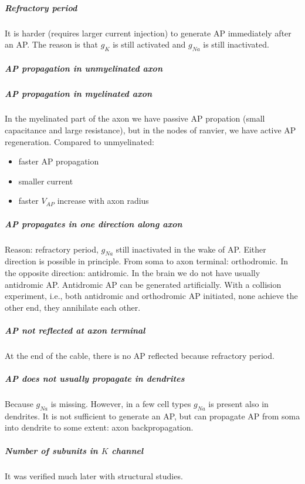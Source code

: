 \documentclass[main]{subfiles}
\begin{document}
\subparagraph{Refractory period}
It is harder (requires larger current injection) to generate AP immediately after an AP. The reason is that $g_K$ is still activated and $g_{Na}$ is still inactivated.

\subparagraph{AP propagation in unmyelinated axon}

\subparagraph{AP propagation in myelinated axon}
In the myelinated part of the axon we have passive AP propation (small capacitance and large resistance), but in the nodes of ranvier, we have active AP regeneration.
Compared to unmyelinated:
\begin{itemize}
\item faster AP propagation
\item smaller current
\item faster $V_{AP}$ increase with axon radius
\end{itemize}

\subparagraph{AP propagates in one direction along axon}
Reason: refractory period, $g_{Na}$ still inactivated  in the wake of AP. Either direction is possible in principle. From soma to axon terminal: orthodromic. In the opposite direction: antidromic. In the brain we do not have usually antidromic AP.
Antidromic AP can be generated artificially. With a collision experiment, i.e., both antidromic and orthodromic AP initiated, none achieve the other end, they annihilate each other.

\subparagraph{AP not reflected at axon terminal}
At the end of the cable, there is no AP reflected because refractory period.

\subparagraph{AP does not usually propagate in dendrites}
Because $g_{Na}$ is missing. However, in a few cell types $g_{Na}$ is present also in dendrites. It is not sufficient to generate an AP, but can propagate AP from soma into dendrite to some extent: axon backpropagation.

\subparagraph{Number of subunits in $K$ channel}
It was verified much later with structural studies.

\end{document}
